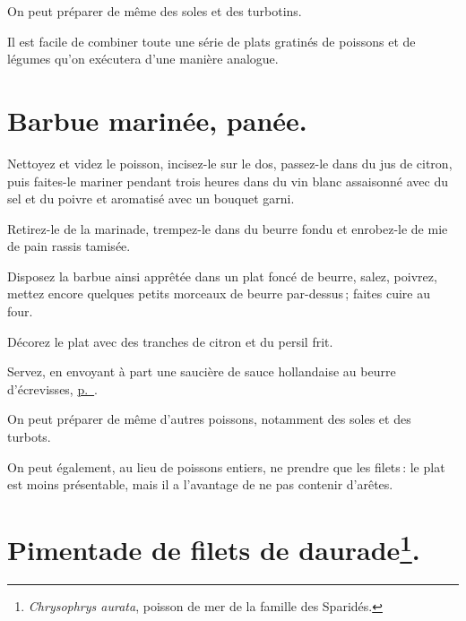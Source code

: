 \sk

On peut préparer de même des soles et des turbotins.

\sk

Il est facile de combiner toute une série de plats gratinés de poissons et de
légumes qu'on exécutera d'une manière analogue.

\section*{\centering Barbue marinée, panée.}
\label{pg0385} \hypertarget{p0385}{}

Nettoyez et videz le poisson, incisez-le sur le dos, passez-le dans du jus de
citron, puis faites-le mariner pendant trois heures dans du vin blanc
assaisonné avec du sel et du poivre et aromatisé avec un bouquet garni.

Retirez-le de la marinade, trempez-le dans du beurre fondu et enrobez-le de
mie de pain rassis tamisée.

Disposez la barbue ainsi apprêtée dans un plat foncé de beurre, salez, poivrez,
mettez encore quelques petits morceaux de beurre par-dessus ; faites cuire au
four.

Décorez le plat avec des tranches de citron et du persil frit.

Servez, en envoyant à part une saucière de sauce hollandaise au beurre
d'écrevisses, \hyperlink{p0363}{p. \pageref{pg0363}}.

\sk

On peut préparer de même d’autres poissons, notamment des soles et des turbots.

\sk

On peut également, au lieu de poissons entiers, ne prendre que les filets : le
plat est moins présentable, mais il a l'avantage de ne pas contenir d'arêtes.

\section*{\centering Pimentade de filets de daurade\footnote{\textit{Chrysophrys aurata},
                                           poisson de mer de la famille des Sparidés.}.}

